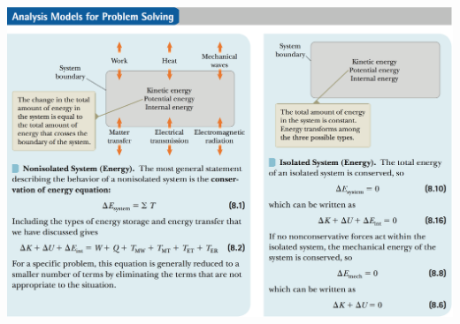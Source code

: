 \documentclass[12pt,a4paper]{article}
\newcommand{\N}{\noindent}
\begin{document}
		\vspace{2mm}
		\N \includegraphics[scale=.43]{8_b.png}
\end{document}
